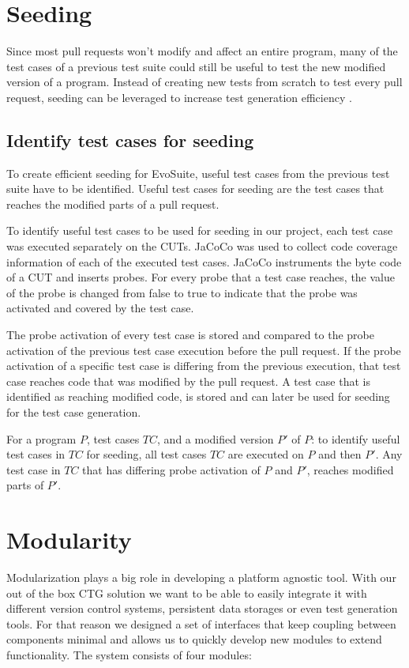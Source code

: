 \documentclass[12pt, a4paper]{article}
\begin{document}
\section{Seeding}
Since most pull requests won’t modify and affect an entire program, many of the test cases of a previous test suite could still be useful to test the new modified version of a program. Instead of creating new tests from scratch to test every pull request, seeding can be leveraged to increase test generation efficiency \cite{campos_continuous_2014}.



\subsection{Identify test cases for seeding}
To create efficient seeding for EvoSuite, useful test cases from the previous test suite have to be identified. Useful test cases for seeding are the test cases that reaches the modified parts of a pull request.

To identify useful test cases to be used for seeding in our project, each test case was executed separately on the CUTs. JaCoCo was used to collect code coverage information of each of the executed test cases. JaCoCo instruments the byte code of a CUT and inserts probes. For every probe that a test case reaches, the value of the probe is changed from false to true to indicate that the probe was activated and covered by the test case.

The probe activation of every test case is stored and compared to the probe activation of the previous test case execution before the pull request. If the probe activation of a specific test case is differing from the previous execution, that test case reaches code that was modified by the pull request. A test case that is identified as reaching modified code, is stored and can later be used for seeding for the test case generation. 

For a program $P$, test cases $TC$, and a modified version $P'$ of $P$: to identify useful test cases in $TC$ for seeding, all test cases $TC$ are executed on $P$ and then $P'$. Any test case in $TC$ that has differing probe activation of $P$ and $P'$, reaches modified parts of $P'$.

\section{Modularity}
Modularization plays a big role in developing a platform agnostic tool. With our out of the box CTG solution we want to be able to easily integrate it with different version control systems, persistent data storages or even test generation tools. For that reason we designed a set of interfaces that keep coupling between components minimal and allows us to quickly develop new modules to extend functionality. The system consists of four modules:
\end{document}
